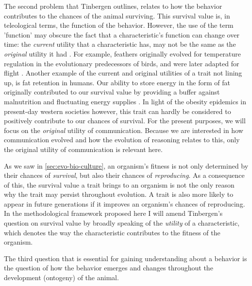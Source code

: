 The second problem that Tinbergen outlines, relates to how the behavior contributes to the chances of the animal surviving.
This survival value is, in teleological terms, the function of the behavior.  However, the use of the term 'function' may obscure the fact that a characteristic's function can change over time: the \emph{current} utility that a characteristic has, may not be the same as the \emph{original} utility it had \citep{BatesonLaland13}. For example, feathers originally evolved for temperature regulation in the evolutionary predecessors of birds, and were later adapted for flight \citep{Benton19, BatesonLaland13}.
Another example of the current and original utilities of a trait not lining up, is fat retention in humans. Our ability to store energy in the form of fat originally contributed to our survival value by providing a buffer against malnutrition and fluctuating energy supplies \citep{Wells06}. In light of the obesity epidemics in present-day western societies however, this trait can hardly be considered to positively contribute to our chances of survival.
For the present purposes, we will focus on the \emph{original} utility of communication. Because we are interested in how communication evolved and how the evolution of reasoning relates to this, only the original utility of communication is relevant here.

As we saw in \cref{sec:evo-bio-culture}, an organism's fitness is not only determined by their chances of \emph{survival}, but also their chances of \emph{reproducing}. As a consequence of this, the survival value a trait brings to an organism is not the only reason why the trait may persist throughout evolution. A trait is also more likely to appear in future generations if it improves an organism's chances of reproducing. In the methodological framework proposed here I will amend Tinbergen's question on survival value by broadly speaking of the \emph{utility} of a characteristic, which denotes the way the characteristic contributes to the fitness of the organism.

The third question that is essential for gaining understanding about a behavior is the question of how the behavior emerges and changes throughout the development (ontogeny) of the animal.

